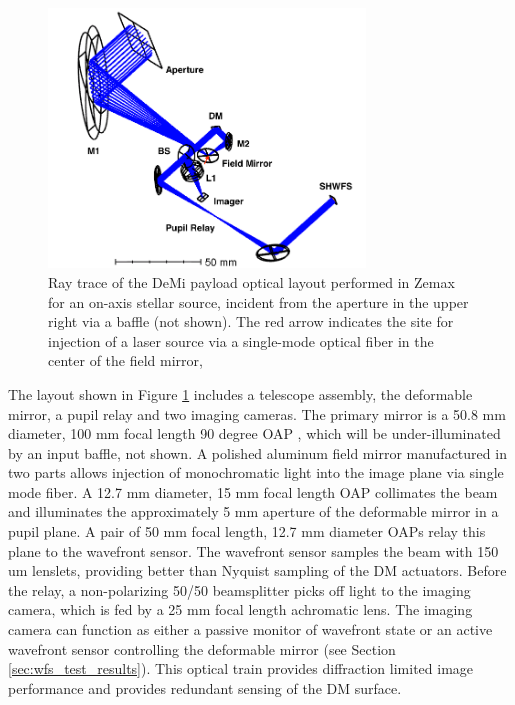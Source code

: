 \documentclass[]{spie}  %
\begin{document}
\begin{figure}[htbp]
\begin{center}
\includegraphics[width=0.75\textwidth]{optical_layout.png}
\caption{Ray trace of the DeMi payload optical layout performed in Zemax for an on-axis stellar source, incident from the aperture in the upper right via a baffle (not shown). The red arrow indicates the site for injection of a laser source via a single-mode optical fiber in the center of the field mirror,}
\label{fig:optical_layout}
\end{center}
\end{figure}
The  layout shown in Figure \ref{fig:optical_layout} includes a telescope assembly, the deformable mirror, a pupil relay and two imaging cameras.
 The primary mirror is a 50.8 mm diameter, 100 mm focal length 90 degree \gls{OAP} , which will be under-illuminated by an input baffle, not shown.
A polished aluminum field mirror manufactured in two parts allows injection of monochromatic light into the image plane via single mode fiber.
A 12.7 mm diameter, 15 mm focal length OAP collimates the beam and illuminates the approximately 5 mm aperture of the deformable mirror in a pupil plane.
A pair of 50 mm focal length, 12.7 mm diameter OAPs relay this plane to the wavefront sensor. 
The wavefront sensor samples the beam with 150 um lenslets, providing better than Nyquist sampling of the \gls{DM} actuators. 
Before the relay, a non-polarizing  50/50 beamsplitter picks off light to the imaging camera, which is fed by a 25 mm focal length achromatic lens.
The imaging camera can function as either a passive monitor of wavefront state or an active wavefront sensor controlling the deformable mirror (see Section \ref{sec:wfs_test_results}).
This optical train provides diffraction limited image performance and  provides redundant sensing of the \gls{DM} surface.
\end{document}

